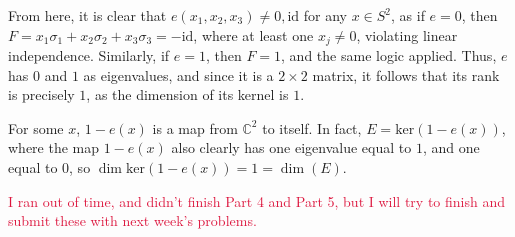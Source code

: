 \documentclass[aps,pra,showpacs,notitlepage,onecolumn,superscriptaddress,nofootinbib]{revtex4-1}
\newcommand{\pop}[1]{\textcolor{crimson}{#1}}
\newcommand{\hhrulefill}{\hspace{-1.0em}\hrulefill}
\theoremstyle{definition}
\begin{document}
\noindent From here, it is clear that $e(x_1, x_2, x_3) \neq 0, \text{id}$ for any $x \in S^2$, as if $e = 0$, then $F = x_1 \sigma_1 + x_2 \sigma_2 + x_3 \sigma_3 = -\text{id}$, where at least one $x_j \neq 0$, violating linear independence.
Similarly, if $e = 1$, then $F = 1$, and the same logic applied. Thus, $e$ has $0$ and $1$ as eigenvalues, and since it is a $2 \times 2$ matrix, it follows that its rank is precisely $1$, as the dimension of its kernel is $1$.

For some $x$, $1 - e(x)$ is a map from $\mathbb{C}^2$ to itself. In fact, $E = \text{ker}(1 - e(x))$, where the map $1 - e(x)$ also clearly has one eigenvalue equal to $1$, and one equal to $0$, so $\dim \text{ker}(1 - e(x)) = 1 = \dim(E)$.
\newline

\noindent \pop{I ran out of time, and didn't finish Part 4 and Part 5, but I will try to finish and submit these with next week's problems.}

\hhrulefill
\end{document}
